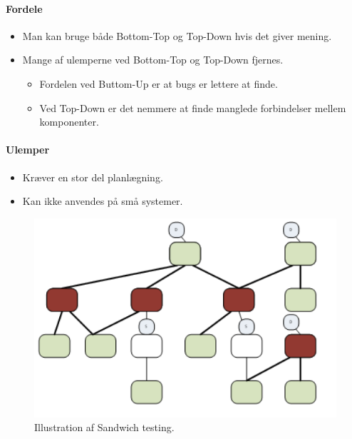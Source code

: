 \paragraph{Fordele}

\begin{itemize}
	\item Man kan bruge både Bottom-Top og Top-Down hvis det giver mening.
	\item Mange af ulemperne ved Bottom-Top og Top-Down fjernes.
	
	\begin{itemize}
		\item Fordelen ved Buttom-Up er at bugs er lettere at finde.
		\item Ved Top-Down er det nemmere at finde manglede forbindelser mellem komponenter.
	\end{itemize}
	
\end{itemize}

\paragraph{Ulemper}

\begin{itemize}
	\item Kræver en stor del planlægning.
	\item Kan ikke anvendes på små systemer.
\end{itemize}

\begin{figure}[H]
	\centering
	\includegraphics[width=0.5\linewidth]{figs/sandwich.PNG}
	\caption{Illustration af Sandwich testing.}
	\label{fig:sandwich}
\end{figure}






























